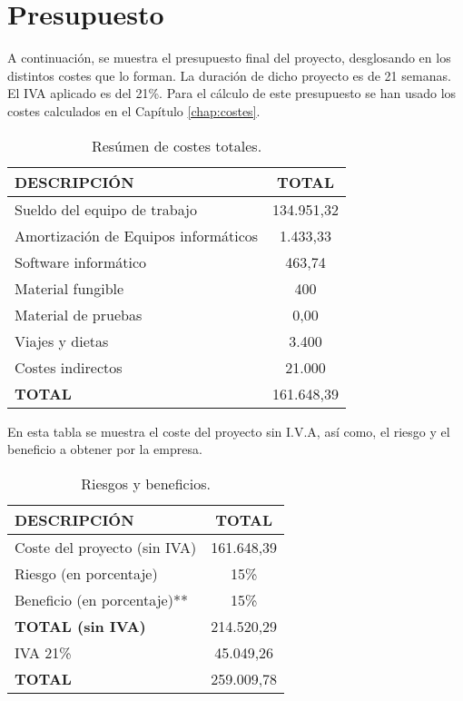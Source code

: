 \section{Presupuesto}

\par A continuación, se muestra el presupuesto final del proyecto, desglosando en los distintos costes que lo forman. La duración de dicho proyecto es de 21 semanas. El IVA aplicado es del 21\%. Para el cálculo de este presupuesto se han usado los costes calculados en el Capítulo \ref{chap:costes}.



\begin{table}[H]
\begin{center}
\begin{tabular}{l c}
\textbf{DESCRIPCIÓN} & \textbf{TOTAL}\\ \hline \hline
Sueldo del equipo de trabajo & 134.951,32\\
Amortización de Equipos informáticos & 1.433,33\\
Software informático & 463,74\\
Material fungible & 400\\
Material de pruebas & 0,00\\
Viajes y dietas & 3.400\\
Costes indirectos & 21.000\\ \hline \hline
\textbf{TOTAL} & 161.648,39\\ \hline
\end{tabular}
\caption{Resúmen de costes totales.}
\label{tab:resumenTotal}
\end{center}
\end{table}

En esta tabla se muestra el coste del proyecto sin I.V.A, así como, el riesgo y el beneficio a obtener por la empresa.
\begin{table}[H]
\begin{center}
\begin{tabular}{l c}
\textbf{DESCRIPCIÓN} & \textbf{TOTAL}\\ \hline \hline
Coste del proyecto (sin IVA) &  161.648,39\\
Riesgo (en porcentaje) & 15\% \\
Beneficio (en porcentaje)** & 15\% \\ \hline \hline
\textbf{TOTAL (sin IVA)} & 214.520,29\\ \hline \hline
IVA 21\% & 45.049,26 \\\hline \hline
\textbf{TOTAL} & 259.009,78\\ \hline
\end{tabular}
\caption{Riesgos y beneficios.}
\label{tab:total}
\end{center}
\end{table}




